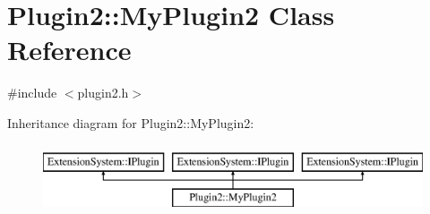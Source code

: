 \hypertarget{class_plugin2_1_1_my_plugin2}{\section{\-Plugin2\-:\-:\-My\-Plugin2 \-Class \-Reference}
\label{class_plugin2_1_1_my_plugin2}
}


{\ttfamily \#include $<$plugin2.\-h$>$}

\-Inheritance diagram for \-Plugin2\-:\-:\-My\-Plugin2\-:\begin{figure}[H]
\begin{center}
\leavevmode
\includegraphics[height=2.000000cm]{class_plugin2_1_1_my_plugin2}
\end{center}
\end{figure}
